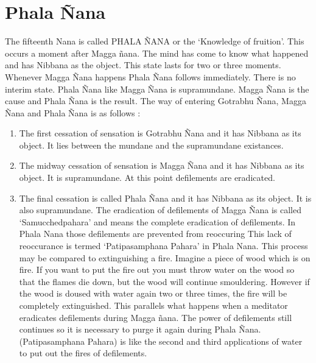 \documentclass[a5paper,10pt,english]{book}
\begin{document}
\section{Phala Ñana}
\label{\detokenize{progress:phala-nana}}
\sphinxAtStartPar
The fifteenth Nana is called PHALA ÑANA or the ‘Knowledge of fruition’. This occurs a moment after Magga ñana. The mind has come to know what happened and has Nibbana as the object. This state lasts for two or three moments. Whenever Magga Ñana happens Phala Ñana follows immediately. There is no interim state. Phala Ñana like Magga Ñana is supramundane. Magga Ñana is the cause and Phala Ñana is the result. The way of entering Gotrabhu Ñana, Magga Ñana and Phala Ñana is as follows :\sphinxhyphen{}
\begin{enumerate}
%
\item {} 
\sphinxAtStartPar
The first cessation of sensation is Gotrabhu Ñana and it has Nibbana as its object. It lies between the mundane and the supramundane existances.

\item {} 
\sphinxAtStartPar
The midway cessation of sensation is Magga Ñana and it has Nibbana as its object. It is supramundane. At this point defilements are eradicated.

\item {} 
\sphinxAtStartPar
The final cessation is called Phala Ñana and it has Nibbana as its object. It is also supramundane. The eradication of defilements of Magga Ñana is called ‘Samucchedpahara’ and means the complete eradication of defilements. In Phala Nana those defilements are prevented from re\sphinxhyphen{}occuring This lack of re\sphinxhyphen{}occurance is termed ‘Patipasamphana Pahara’ in Phala Nana. This process may be compared to extinguishing a fire. Imagine a piece of wood which is on fire. If you want to put the fire out you must throw water on the wood so that the flames die down, but the wood will continue smouldering. However if the wood is doused with water again two or three times, the fire will be completely extinguished. This parallels what happens when a meditator eradicates defilements during Magga ñana. The power of defilements still continues so it is necessary to purge it again during Phala Ñana. (Patipasamphana Pahara) is like the second and third applications of water to put out the fires of defilements.

\end{enumerate}
\end{document}
